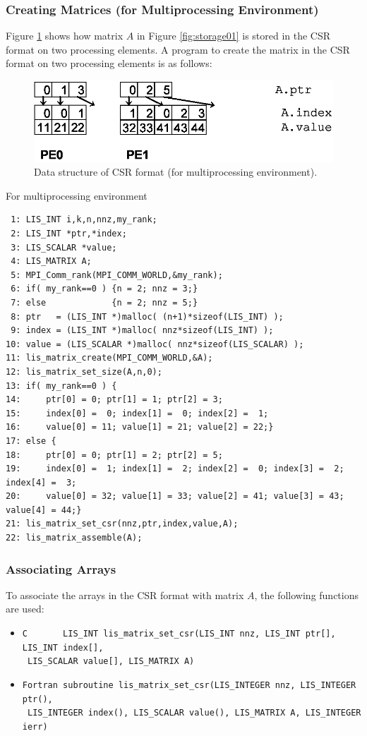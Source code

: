 \documentclass[a4paper]{article}
\begin{document}
\newpage
\subsubsection{Creating Matrices (for Multiprocessing Environment)}
Figure \ref{fig:storage01_mpi} shows how matrix $A$ in 
Figure \ref{fig:storage01} is stored in the CSR format on two 
processing elements. A program to create the matrix in the CSR format 
on two processing elements is as follows:
\begin{figure}[h]
{\centering 
\includegraphics{storage01_mpi.eps} 
\caption{Data structure of CSR format (for multiprocessing environment).}\label{fig:storage01_mpi}}
\end{figure}
\begin{itemsquarebox}[l]{For multiprocessing environment}
\small
\begin{verbatim}
 1: LIS_INT i,k,n,nnz,my_rank;
 2: LIS_INT *ptr,*index;
 3: LIS_SCALAR *value;
 4: LIS_MATRIX A;
 5: MPI_Comm_rank(MPI_COMM_WORLD,&my_rank);
 6: if( my_rank==0 ) {n = 2; nnz = 3;}
 7: else             {n = 2; nnz = 5;}
 8: ptr   = (LIS_INT *)malloc( (n+1)*sizeof(LIS_INT) );
 9: index = (LIS_INT *)malloc( nnz*sizeof(LIS_INT) );
10: value = (LIS_SCALAR *)malloc( nnz*sizeof(LIS_SCALAR) );
11: lis_matrix_create(MPI_COMM_WORLD,&A);
12: lis_matrix_set_size(A,n,0);
13: if( my_rank==0 ) {
14:     ptr[0] = 0; ptr[1] = 1; ptr[2] = 3;
15:     index[0] =  0; index[1] =  0; index[2] =  1;
16:     value[0] = 11; value[1] = 21; value[2] = 22;}
17: else {
18:     ptr[0] = 0; ptr[1] = 2; ptr[2] = 5;
19:     index[0] =  1; index[1] =  2; index[2] =  0; index[3] =  2; index[4] =  3;
20:     value[0] = 32; value[1] = 33; value[2] = 41; value[3] = 43; value[4] = 44;}
21: lis_matrix_set_csr(nnz,ptr,index,value,A);
22: lis_matrix_assemble(A);
\end{verbatim}
\end{itemsquarebox}

\subsubsection{Associating Arrays}
To associate the arrays in the CSR format with matrix $A$, the following functions are used:
\begin{itemize}
\item \verb|C       LIS_INT lis_matrix_set_csr(LIS_INT nnz, LIS_INT ptr[], LIS_INT index[],|\\
      \verb| LIS_SCALAR value[], LIS_MATRIX A)|
\item \verb|Fortran subroutine lis_matrix_set_csr(LIS_INTEGER nnz, LIS_INTEGER ptr(),|\\
      \verb| LIS_INTEGER index(), LIS_SCALAR value(), LIS_MATRIX A, LIS_INTEGER ierr)|
\end{itemize}
\end{document}
